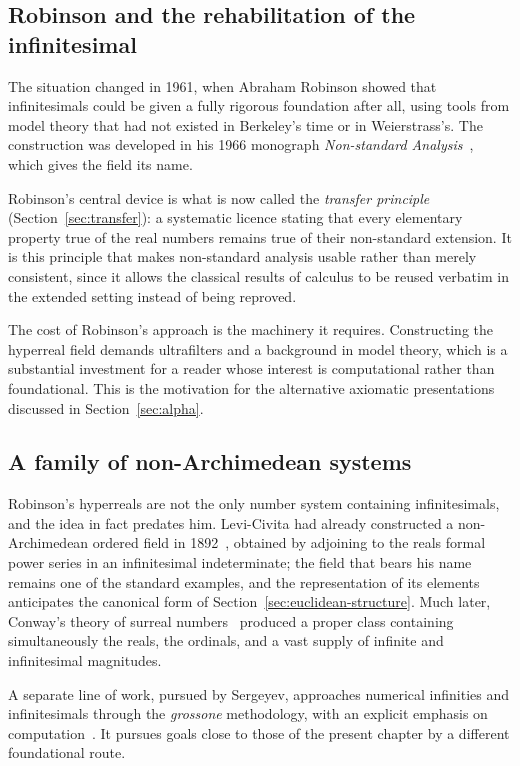 \subsection{Robinson and the rehabilitation of the infinitesimal}

The situation changed in 1961, when Abraham Robinson showed that infinitesimals
could be given a fully rigorous foundation after all, using tools from model theory
that had not existed in Berkeley's time or in Weierstrass's. The construction was
developed in his 1966 monograph \emph{Non-standard
Analysis}~\cite{robinson1996nonstandard}, which gives the field its name.

Robinson's central device is what is now called the \emph{transfer principle}
(Section~\ref{sec:transfer}): a systematic licence stating that every elementary
property true of the real numbers remains true of their non-standard extension. It
is this principle that makes non-standard analysis usable rather than merely
consistent, since it allows the classical results of calculus to be reused verbatim
in the extended setting instead of being reproved.

The cost of Robinson's approach is the machinery it requires. Constructing the
hyperreal field demands ultrafilters and a background in model theory, which is a
substantial investment for a reader whose interest is computational rather than
foundational. This is the motivation for the alternative axiomatic presentations
discussed in Section~\ref{sec:alpha}.

\subsection{A family of non-Archimedean systems}

Robinson's hyperreals are not the only number system containing infinitesimals, and
the idea in fact predates him. Levi-Civita had already constructed a non-Archimedean
ordered field in 1892~\cite{levicivita1892infiniti}, obtained by adjoining to the
reals formal power series in an infinitesimal indeterminate; the field that bears his
name remains one of the standard examples, and the representation of its elements
anticipates the canonical form of Section~\ref{sec:euclidean-structure}. Much later,
Conway's theory of surreal numbers~\cite{conway2000numbers} produced a
proper class containing simultaneously the reals, the ordinals, and a vast supply of
infinite and infinitesimal magnitudes.

A separate line of work, pursued by Sergeyev, approaches numerical infinities and
infinitesimals through the \emph{grossone} methodology, with an explicit emphasis on
computation~\cite{sergeyev2017numerical}. It pursues goals close to those of the
present chapter by a different foundational route.

